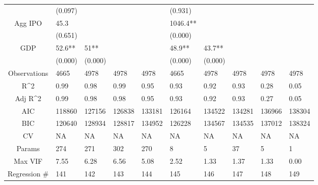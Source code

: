 \documentclass{article}
\begin{document}
\begin{table}[H]
\begin{tabular}{|clllllllll|}
   & (0.097) &  &  &  & (0.931) &  &  &  &  \\ 
  Agg IPO & 45.3 &  &  &  & 1046.4** &  &  &  &  \\ 
   & (0.651) &  &  &  & (0.000) &  &  &  &  \\ 
  GDP & 52.6** & 51** &  &  & 48.9** & 43.7** &  &  &  \\ 
   & (0.000) & (0.000) &  &  & (0.000) & (0.000) &  &  &  \\ 
  \hline 
 Observations & 4665 & 4978 & 4978 & 4978 & 4665 & 4978 & 4978 & 4978 & 4978 \\ 
  R^2 & 0.99 & 0.98 & 0.99 & 0.95 & 0.93 & 0.92 & 0.93 & 0.28 & 0.05 \\ 
  Adj R^2 & 0.99 & 0.98 & 0.98 & 0.95 & 0.93 & 0.92 & 0.93 & 0.27 & 0.05 \\ 
  AIC & 118860 & 127156 & 126838 & 133181 & 126164 & 134522 & 134281 & 136966 & 138304 \\ 
  BIC & 120640 & 128934 & 128817 & 134952 & 126228 & 134567 & 134535 & 137012 & 138324 \\ 
  CV & NA & NA & NA & NA & NA & NA & NA & NA & NA \\ 
  Params & 274 & 271 & 302 & 270 & 8 & 5 & 37 & 5 & 1 \\ 
  Max VIF & 7.55 & 6.28 & 6.56 & 5.08 & 2.52 & 1.33 & 1.37 & 1.33 & 0.00 \\ 
  Regression \# & 141 & 142 & 143 & 144 & 145 & 146 & 147 & 148 & 149 \\ 
   \hline
\end{tabular}
 
\end{table}
\end{document}
